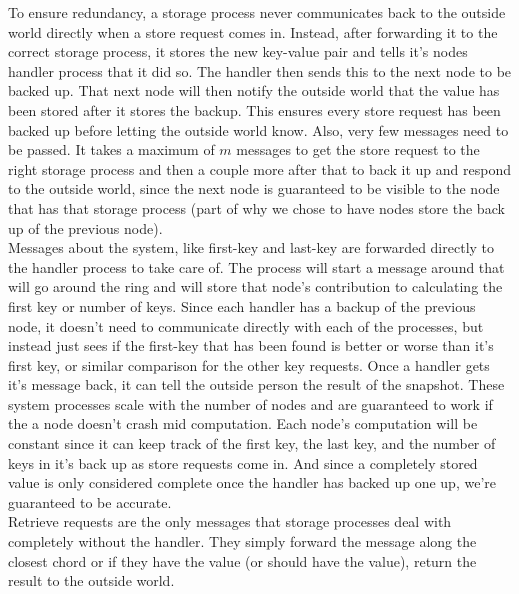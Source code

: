 \documentclass[12pt,letterpaper]{article}
\begin{document}
To ensure redundancy, a storage process never communicates back to the outside world directly when a store request comes in. Instead, after forwarding it to the correct storage process, it stores the new key-value pair and tells it's nodes handler process that it did so. The handler then sends this to the next node to be backed up. That next node will then notify the outside world that the value has been stored after it stores the backup. This ensures every store request has been backed up before letting the outside world know. Also, very few messages need to be passed. It takes a maximum of $m$ messages to get the store request to the right storage process and then a couple more after that to back it up and respond to the outside world, since the next node is guaranteed to be visible to the node that has that storage process (part of why we chose to have nodes store the back up of the previous node). \\
Messages about the system, like first-key and last-key are forwarded directly to the handler process to take care of. The process will start a message around that will go around the ring and will store that node's contribution to calculating the first key or number of keys. Since each handler has a backup of the previous node, it doesn't need to communicate directly with each of the processes, but instead just sees if the first-key that has been found is better or worse than it's first key, or similar comparison for the other key requests. Once a handler gets it's message back, it can tell the outside person the result of the snapshot. These system processes scale with the number of nodes and are guaranteed to work if the a node doesn't crash mid computation. Each node's computation will be constant since it can keep track of the first key, the last key, and the number of keys in it's back up as store requests come in. And since a completely stored value is only considered complete once the handler has backed up one up, we're guaranteed to be accurate. \\
Retrieve requests are the only messages that storage processes deal with completely without the handler. They simply forward the message along the closest chord or if they have the value (or should have the value), return the result to the outside world.
\end{document}
